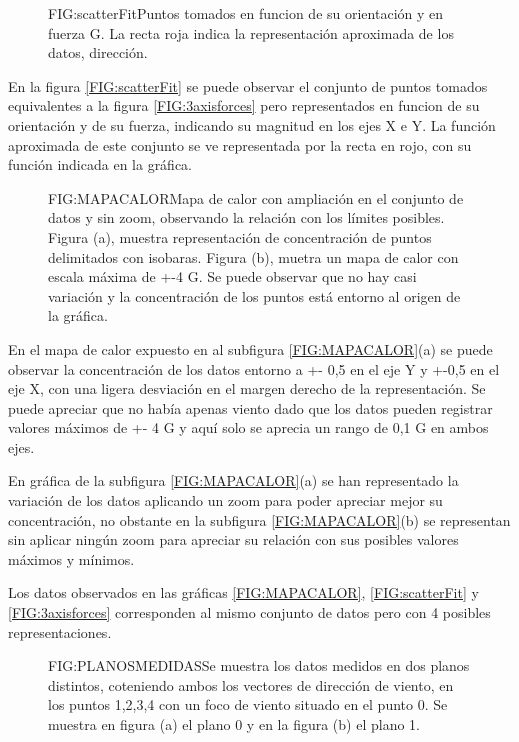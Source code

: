 \begin{figure}[Puntos de medida]{FIG:scatterFit}{Puntos tomados en funcion de su orientación y en fuerza G. La recta roja indica la representación aproximada de los datos, dirección.}
\end{figure}
En la figura \ref{FIG:scatterFit} se puede observar el conjunto de puntos tomados equivalentes a la figura \ref{FIG:3axisforces} pero representados en funcion de su orientación y de su fuerza, indicando su magnitud en los ejes X e Y. La función aproximada de este conjunto se ve representada por la recta en rojo, con su función indicada en la gráfica.

\begin{figure}[Mapa de calor con y sin zoom]{FIG:MAPACALOR}{Mapa de calor con ampliación en el conjunto de datos y sin zoom, observando la relación con los límites posibles. Figura (a), muestra representación de concentración de puntos delimitados con isobaras. Figura (b), muetra un mapa de calor con escala máxima de +-4 G. Se puede observar que no hay casi variación y la concentración de los puntos está entorno al origen de la gráfica.}
\end{figure}

En el mapa de calor expuesto en al subfigura \ref{FIG:MAPACALOR}(a) se puede observar la concentración de los datos entorno a +- 0,5 en el eje Y y +-0,5 en el eje X, con una ligera desviación en el margen derecho de la representación. Se puede apreciar que no había apenas viento dado que los datos pueden registrar valores máximos de +- 4 G y aquí solo se aprecia un rango de 0,1 G en ambos ejes.

En gráfica de la subfigura \ref{FIG:MAPACALOR}(a) se han representado la variación de los datos aplicando un zoom para poder apreciar mejor su concentración, no obstante en la subfigura \ref{FIG:MAPACALOR}(b) se representan sin aplicar ningún zoom para apreciar su relación con sus posibles valores máximos y mínimos.

Los datos observados en las gráficas \ref{FIG:MAPACALOR}, \ref{FIG:scatterFit} y \ref{FIG:3axisforces} corresponden al mismo conjunto de datos pero con 4 posibles representaciones.


\begin{figure}[Toma de medidas dividida en planos]{FIG:PLANOSMEDIDAS}{Se muestra los datos medidos en dos planos distintos, coteniendo ambos los vectores de dirección de viento, en los puntos 1,2,3,4 con un foco de viento situado en el punto 0. Se muestra en figura (a) el plano 0 y en la figura (b) el plano 1.}
\end{figure}

